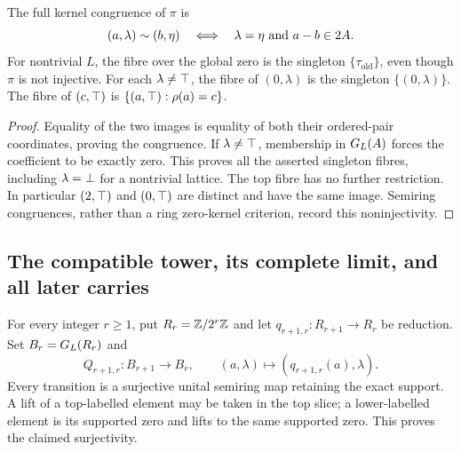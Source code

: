 \begin{proposition}\label{BLR-prop:kernel-congruence}
The full kernel congruence of $\pi$ is
\[
 (a,\lambda)\sim(b,\eta)
 \quad\Longleftrightarrow\quad
 \lambda=\eta\ \hbox{and}\ a-b\in2A.
\]
For nontrivial $L$, the fibre over the global zero is the singleton
$\{\tau_{\mathrm{old}}\}$, even though $\pi$ is not injective.
For each $\lambda\ne\top$, the fibre of $(0,\lambda)$ is the singleton
$\{(0,\lambda)\}$. The fibre of $(c,\top)$ is
$\{(a,\top):\rho(a)=c\}$.
\end{proposition}
\begin{proof}
Equality of the two images is equality of both their ordered-pair
coordinates, proving the congruence. If $\lambda\ne\top$, membership
in $G_L(A)$ forces the coefficient to be exactly zero. This proves all
the asserted singleton fibres, including $\lambda=\bot$ for a
nontrivial lattice. The top fibre has no further restriction. In
particular $(2,\top)$ and $(0,\top)$ are distinct and have the same
image. Semiring congruences, rather than a ring zero-kernel criterion,
record this noninjectivity.
\end{proof}

\subsection{The compatible tower, its complete limit, and all later carries}
For every integer $r\geq1$, put $R_r=\mathbb Z/2^r\mathbb Z$ and let
$q_{r+1,r}:R_{r+1}\to R_r$ be reduction. Set $B_r=G_L(R_r)$ and
\[
 Q_{r+1,r}:B_{r+1}\longrightarrow B_r,\qquad
 (a,\lambda)\longmapsto(q_{r+1,r}(a),\lambda).
\]
Every transition is a surjective unital semiring map retaining the exact
support. A lift of a top-labelled element may be taken in the top slice;
a lower-labelled element is its supported zero and lifts to the same
supported zero. This proves the claimed surjectivity.


